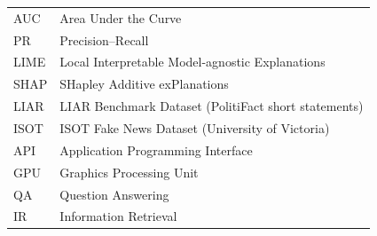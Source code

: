 \begin{longtable}{p{1.6in} p{4.0in}}
AUC & Area Under the Curve \\
PR & Precision--Recall \\
LIME & Local Interpretable Model-agnostic Explanations \\
SHAP & SHapley Additive exPlanations \\
LIAR & LIAR Benchmark Dataset (PolitiFact short statements) \\
ISOT & ISOT Fake News Dataset (University of Victoria) \\
API & Application Programming Interface \\
GPU & Graphics Processing Unit \\
QA & Question Answering \\
IR & Information Retrieval
\end{longtable}
